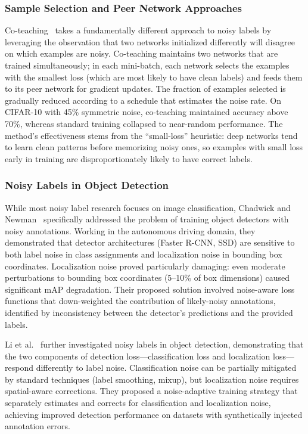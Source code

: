 \subsubsection{Sample Selection and Peer Network Approaches}

Co-teaching~\cite{han2018coteaching} takes a fundamentally different approach to noisy labels by leveraging the observation that two networks initialized differently will disagree on which examples are noisy. Co-teaching maintains two networks that are trained simultaneously; in each mini-batch, each network selects the examples with the smallest loss (which are most likely to have clean labels) and feeds them to its peer network for gradient updates. The fraction of examples selected is gradually reduced according to a schedule that estimates the noise rate. On CIFAR-10 with 45\% symmetric noise, co-teaching maintained accuracy above 70\%, whereas standard training collapsed to near-random performance. The method's effectiveness stems from the ``small-loss'' heuristic: deep networks tend to learn clean patterns before memorizing noisy ones, so examples with small loss early in training are disproportionately likely to have correct labels.

\subsubsection{Noisy Labels in Object Detection}

While most noisy label research focuses on image classification, Chadwick and Newman~\cite{chadwick2019training} specifically addressed the problem of training object detectors with noisy annotations. Working in the autonomous driving domain, they demonstrated that detector architectures (Faster R-CNN, SSD) are sensitive to both label noise in class assignments and localization noise in bounding box coordinates. Localization noise proved particularly damaging: even moderate perturbations to bounding box coordinates (5--10\% of box dimensions) caused significant mAP degradation. Their proposed solution involved noise-aware loss functions that down-weighted the contribution of likely-noisy annotations, identified by inconsistency between the detector's predictions and the provided labels.

Li et al.~\cite{li2020towards} further investigated noisy labels in object detection, demonstrating that the two components of detection loss---classification loss and localization loss---respond differently to label noise. Classification noise can be partially mitigated by standard techniques (label smoothing, mixup), but localization noise requires spatial-aware corrections. They proposed a noise-adaptive training strategy that separately estimates and corrects for classification and localization noise, achieving improved detection performance on datasets with synthetically injected annotation errors.

